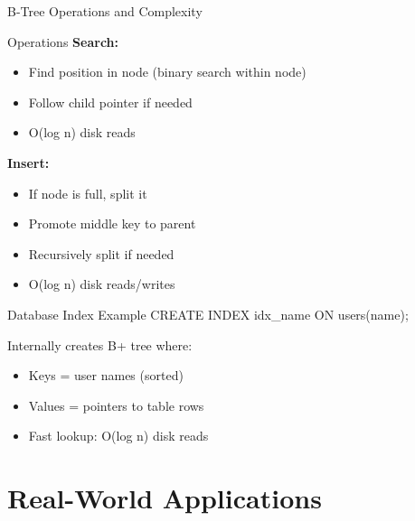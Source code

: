 \documentclass[aspectratio=169,xcolor=dvipsnames]{beamer}
\begin{document}
\begin{frame}{B-Tree Operations and Complexity}
  \begin{block}{Operations}
    \textbf{Search:}
    \begin{itemize}
      \item Find position in node (binary search within node)
      \item Follow child pointer if needed
      \item O(log n) disk reads
    \end{itemize}

    \textbf{Insert:}
    \begin{itemize}
      \item If node is full, split it
      \item Promote middle key to parent
      \item Recursively split if needed
      \item O(log n) disk reads/writes
    \end{itemize}
  \end{block}

  \begin{exampleblock}{Database Index Example}
    CREATE INDEX idx\_name ON users(name);

    Internally creates B+ tree where:
    \begin{itemize}
      \item Keys = user names (sorted)
      \item Values = pointers to table rows
      \item Fast lookup: O(log n) disk reads
    \end{itemize}
  \end{exampleblock}
\end{frame}

\section{Real-World Applications}
\end{document}
